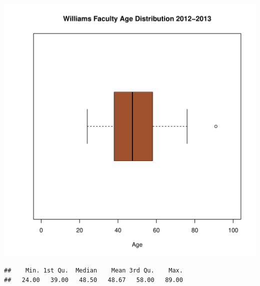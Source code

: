 \documentclass[12pt,a4paper]{article}\usepackage[]{graphicx}\usepackage[]{color}
\makeatletter
\def\maxwidth{ %
  \ifdim\Gin@nat@width>\linewidth
    \linewidth
  \else
    \Gin@nat@width
  \fi
}
\newenvironment{kframe}{%
 \def\at@end@of@kframe{}%
 \ifinner\ifhmode%
  \def\at@end@of@kframe{\end{minipage}}%
  \begin{minipage}{\columnwidth}%
 \fi\fi%
 \def\FrameCommand##1{\hskip\@totalleftmargin \hskip-\fboxsep
 \colorbox{shadecolor}{##1}\hskip-\fboxsep
     \hskip-\linewidth \hskip-\@totalleftmargin \hskip\columnwidth}%
 \MakeFramed {\advance\hsize-\width
   \@totalleftmargin\z@ \linewidth\hsize
   \@setminipage}}%
 {\par\unskip\endMakeFramed%
 \at@end@of@kframe}
\newenvironment{knitrout}{}{} %
\theoremstyle{definition}
\makeatother
\begin{document}
\begin{knitrout}
\color{fgcolor}
\includegraphics[width=\maxwidth]{figure/unnamed-chunk-38-1} 

\end{knitrout}

\begin{knitrout}
\color{fgcolor}\begin{kframe}
\begin{verbatim}
##    Min. 1st Qu.  Median    Mean 3rd Qu.    Max. 
##   24.00   39.00   48.50   48.67   58.00   89.00
\end{verbatim}
\end{kframe}
\end{knitrout}
\end{document}
